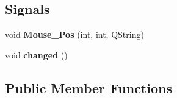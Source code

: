 \subsection*{Signals}
\begin{DoxyCompactItemize}
\item 
\mbox{\label{class_graph_widget_acdaf6aa353aa9b7be0df562f08f7ba5b}} 
void {\bfseries Mouse\+\_\+\+Pos} (int, int, Q\+String)
\item 
\mbox{\label{class_graph_widget_a9b94d72699fe23f47dcaf7dc9c380676}} 
void {\bfseries changed} ()
\end{DoxyCompactItemize}
\subsection*{Public Member Functions}
